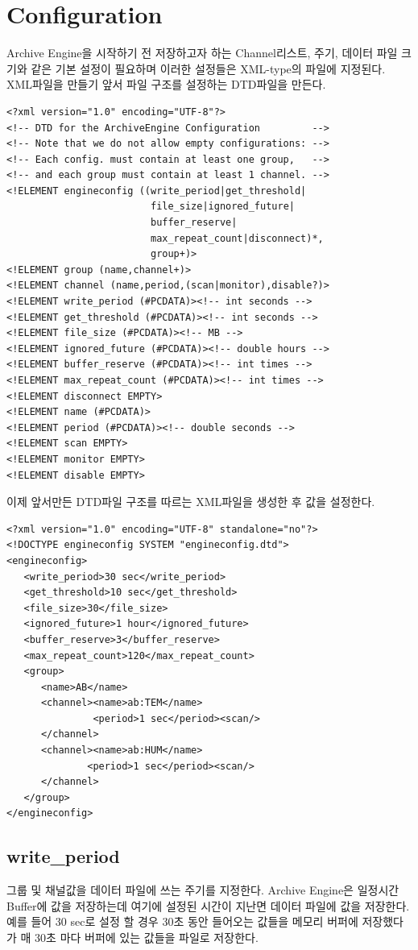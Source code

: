 \documentclass[11pt
  , a4paper
  , article
  , oneside
]{memoir}
\begin{document}
\section{Configuration}
Archive Engine을 시작하기 전 저장하고자 하는 Channel리스트, 주기, 데이터 파일 크기와 같은
기본 설정이 필요하며 이러한 설정들은 XML-type의 파일에 지정된다. XML파일을 만들기 앞서
파일 구조를 설정하는 DTD파일을 만든다.
\begin{lstlisting}[style=termstyle]
<?xml version="1.0" encoding="UTF-8"?>
<!-- DTD for the ArchiveEngine Configuration         -->
<!-- Note that we do not allow empty configurations: -->
<!-- Each config. must contain at least one group,   -->
<!-- and each group must contain at least 1 channel. -->
<!ELEMENT engineconfig ((write_period|get_threshold|
                         file_size|ignored_future|
                         buffer_reserve|
                         max_repeat_count|disconnect)*,
                         group+)>
<!ELEMENT group (name,channel+)>
<!ELEMENT channel (name,period,(scan|monitor),disable?)>
<!ELEMENT write_period (#PCDATA)><!-- int seconds -->
<!ELEMENT get_threshold (#PCDATA)><!-- int seconds -->
<!ELEMENT file_size (#PCDATA)><!-- MB -->
<!ELEMENT ignored_future (#PCDATA)><!-- double hours -->
<!ELEMENT buffer_reserve (#PCDATA)><!-- int times -->
<!ELEMENT max_repeat_count (#PCDATA)><!-- int times -->
<!ELEMENT disconnect EMPTY>
<!ELEMENT name (#PCDATA)>
<!ELEMENT period (#PCDATA)><!-- double seconds -->
<!ELEMENT scan EMPTY>
<!ELEMENT monitor EMPTY>
<!ELEMENT disable EMPTY>
\end{lstlisting} 
이제 앞서만든 DTD파일 구조를 따르는 XML파일을 생성한 후 값을 설정한다.
\begin{lstlisting}[style=termstyle]
<?xml version="1.0" encoding="UTF-8" standalone="no"?>
<!DOCTYPE engineconfig SYSTEM "engineconfig.dtd">
<engineconfig>
   <write_period>30 sec</write_period>
   <get_threshold>10 sec</get_threshold>
   <file_size>30</file_size>
   <ignored_future>1 hour</ignored_future>
   <buffer_reserve>3</buffer_reserve>
   <max_repeat_count>120</max_repeat_count>
   <group>
      <name>AB</name>
      <channel><name>ab:TEM</name>
               <period>1 sec</period><scan/>
      </channel>
      <channel><name>ab:HUM</name>
              <period>1 sec</period><scan/>
      </channel>
   </group>
</engineconfig>
\end{lstlisting}

\subsection{write\_period}
그룹 및 채널값을 데이터 파일에 쓰는 주기를 지정한다. Archive Engine은 일정시간
Buffer에 값을 저장하는데 여기에 설정된 시간이 지난면 데이터 파일에 값을 저장한다.
예를 들어 30 sec로 설정 할 경우 30초 동안 들어오는 값들을 메모리 버퍼에 저장했다가
매 30초 마다 버퍼에 있는 값들을 파일로 저장한다.
\end{document}
